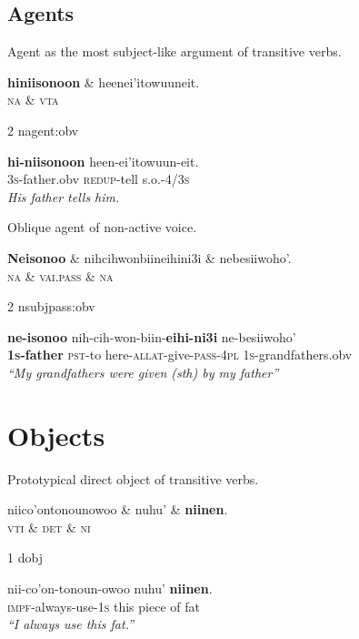 \documentclass{handout}
\begin{document}
\begin{multicols}{2}
\subsection{Agents}
\footnotesize
\begin{exe}
\ex \label{agent:obv} Agent as the most subject-like argument of transitive verbs.\\%
\begin{dependency}
\begin{deptext}
\textbf{hiniisonoon} \& heenei'itowuuneit.\\
\textsc{na} \& \textsc{vta}\\
\end{deptext}
	{2}	{nagent:obv}
\end{dependency}
\gll \textbf{hi-niisonoon} {heen-ei'itowuun-eit}.\\
\textsc{3s}-father.obv {\textsc{redup}-tell s.o.-\textsc{4/3s}}\\
\trans \textit{His father tells him.}
\end{exe}
\begin{exe}
\ex \label{middle} Oblique agent of non-active voice.\\
\begin{dependency}
\begin{deptext}
\textbf{Neisonoo} \& nihcihwonbiineihini3i \& nebesiiwoho'.\\
\textsc{na} \& \textsc{vai.pass}	\& \textsc{na}\\
\end{deptext}
	{2}	{nsubjpass:obv}
\end{dependency}
\gll \textbf{ne-isonoo} {nih-cih-won-biin-\textbf{eihi-ni3i}} {ne-besiiwoho'} \\
\textbf{\textsc{1s}-father} {\textsc{pst}-to here-\textsc{allat}-give-\textsc{pass}-\textsc{4pl}} \textsc{1s}-grandfathers.obv\\
\trans \textit{``My grandfathers were given (sth) by my father''}
\end{exe}
\section{Objects}
\footnotesize
\begin{exe}
\ex \label{objct} Prototypical direct object of transitive verbs.\\%
\begin{dependency}
\begin{deptext}
niico'ontonounowoo \& nuhu' \& \textbf{niinen}.\\
\textsc{vti} \& \textsc{det} \& \textsc{ni}\\
\end{deptext}
	{1}	{dobj}
\end{dependency}
\gll nii-co'on-tonoun-owoo nuhu' \textbf{niinen}.\\
{\textsc{impf}-always-use-\textsc{1s}} this {piece of fat}\\
\trans \textit{``I always use this fat.''}
\end{exe}


\end{multicols}
\end{document}
